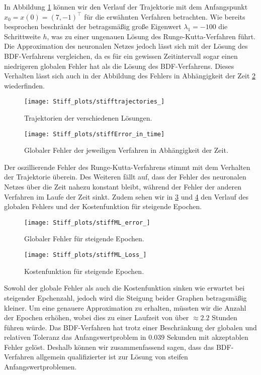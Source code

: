 In Abbildung \ref{fig:stiff-trajectories} können wir den Verlauf der Trajektorie mit dem Anfangspunkt
$x_0=x(0)=(7,-1)^{\intercal}$ für die erwähnten Verfahren betrachten. Wie bereits besprochen beschränkt der betragsmäßig große
Eigenwert $\lambda_1=-100$ die Schrittweite $h$, was zu einer ungenauen Lösung des Runge-Kutta-Verfahren führt. Die
Approximation des neuronalen Netzes jedoch lässt sich mit der Lösung des BDF-Verfahrens vergleichen, da es für ein
gewissen Zeitintervall sogar einen niedrigeren globalen Fehler hat als die Lösung des BDF-Verfahrens.
Dieses Verhalten lässt sich auch in der Abbildung des Fehlers in Abhängigkeit der Zeit \ref{fig:stiff-error-in-time}
wiederfinden.
\begin{figure}
       \centering
       \texttt{[image: Stiff\_plots/stifftrajectories\_]}
       \caption{Trajektorien der verschiedenen Lösungen.}
       \label{fig:stiff-trajectories}
\end{figure}
\begin{figure}
       \centering
       \texttt{[image: Stiff\_plots/stiffError\_in\_time]}
       \caption{Globaler Fehler  der jeweiligen Verfahren in Abhängigkeit der Zeit.}
       \label{fig:stiff-error-in-time}
\end{figure}
Der oszillierende Fehler des Runge-Kutta-Verfahrens stimmt mit dem Verhalten der Trajektorie überein. Des Weiteren fällt
auf, dass der Fehler des neuronalen Netzes über die Zeit nahezu konstant bleibt, während der Fehler der anderen
Verfahren im Laufe der Zeit sinkt. Zudem sehen wir in \ref{fig:stiff-error} und \ref{fig:stiff-loss} den Verlauf des
globalen Fehlers und der Kostenfunktion für steigende Epochen.
\begin{figure}
       \centering
       \texttt{[image: Stiff\_plots/stiffML\_error\_]}
       \caption{Globaler Fehler für steigende Epochen.}
       \label{fig:stiff-error}
\end{figure}
\begin{figure}
       \centering
       \texttt{[image: Stiff\_plots/stiffML\_Loss\_]}
       \caption{Kostenfunktion für steigende Epochen.}
       \label{fig:stiff-loss}
\end{figure}
Sowohl der globale Fehler als auch die Kostenfunktion sinken wie erwartet bei steigender Epchenzahl, jedoch wird die
Steigung beider Graphen betragsmäßig kleiner. Um eine genauere Approximation zu erhalten, müssten wir die Anzahl der
Epochen erhöhen, wobei dies zu einer Laufzeit von über $\approx 2.2$ Stunden führen würde. Das BDF-Verfahren hat
trotz einer Beschränkung der globalen und relativen Toleranz das Anfangswertproblem in $0.039$ Sekunden mit akzeptablen
Fehler gelöst. Deshalb können wir zusammenfassend sagen, dass das BDF-Verfahren allgemein qualifizierter ist zur Lösung
von steifen Anfangswertproblemen.

